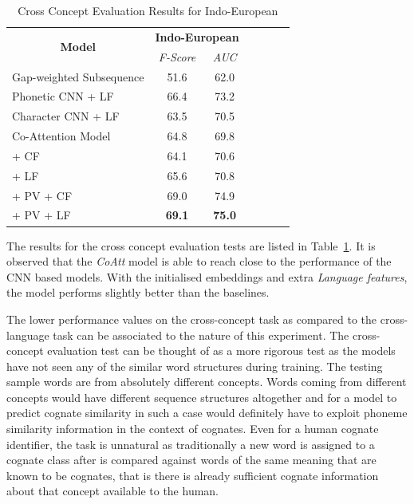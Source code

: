 \documentclass[11pt,letterpaper]{article}
\begin{document}
\begin{table}[t]
\centering
\begin{tabular}{lcccccc}
\multicolumn{1}{c}{\multirow{2}{*}{\textbf{Model}}} & \multicolumn{2}{c}{\textbf{Indo-European}} \\ \cline{2-3} 
\multicolumn{1}{c}{}                                & \textit{F-Score}      & \textit{AUC}    \\ \hline
Gap-weighted Subsequence              & 51.6                  & 62.0            \\
Phonetic CNN + LF                     & 66.4                  & 73.2            \\
Character CNN + LF                    & 63.5                  & 70.5            \\ \hline
Co-Attention Model                    & 64.8                  & 69.8            \\
\quad + CF                            & 64.1                  & 70.6            \\
\quad + LF                            & 65.6                  & 70.8            \\
\quad + PV + CF                       & 69.0                  & 74.9            \\
\quad + PV + LF                       & \textbf{69.1}                  & \textbf{75.0}
\end{tabular}
\label{CC_res}
\caption{Cross Concept Evaluation Results for Indo-European }
\end{table}

The results for the cross concept evaluation tests are listed in Table~\ref{CC_res}. It is observed that the \textit{CoAtt} model is able to reach close to the performance of the CNN based models. With the initialised embeddings and extra \textit{Language features}, the model performs slightly better than the baselines.

The lower performance values on the cross-concept task as compared to the cross-language task can be associated to the nature of this experiment. The cross-concept evaluation test can be thought of as a more rigorous test as the models have not seen any of the similar word structures during training. The testing sample words are from absolutely different concepts. Words coming from different concepts would have different sequence structures altogether and for a model to predict cognate similarity in such a case would definitely have to exploit phoneme similarity information in the context of cognates. Even for a human cognate identifier, the task is unnatural as traditionally a new word is assigned to a cognate class after is compared against words of the same meaning that are known to be cognates, that is there is already sufficient cognate information about that concept available to the human.
\end{document}
